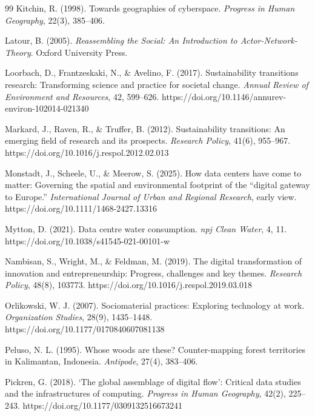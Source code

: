 \documentclass[review]{elsarticle}
\begin{document}
\begin{thebibliography}{99}
Kitchin, R. (1998). Towards geographies of cyberspace. \textit{Progress in Human Geography}, 22(3), 385--406.

Latour, B. (2005). \textit{Reassembling the Social: An Introduction to Actor-Network-Theory}. Oxford University Press.

Loorbach, D., Frantzeskaki, N., \& Avelino, F. (2017). Sustainability transitions research: Transforming science and practice for societal change. \textit{Annual Review of Environment and Resources}, 42, 599--626. https://doi.org/10.1146/annurev-environ-102014-021340

Markard, J., Raven, R., \& Truffer, B. (2012). Sustainability transitions: An emerging field of research and its prospects. \textit{Research Policy}, 41(6), 955--967. https://doi.org/10.1016/j.respol.2012.02.013

Monstadt, J., Scheele, U., \& Meerow, S. (2025). How data centers have come to matter: Governing the spatial and environmental footprint of the ``digital gateway to Europe.'' \textit{International Journal of Urban and Regional Research}, early view. https://doi.org/10.1111/1468-2427.13316

Mytton, D. (2021). Data centre water consumption. \textit{npj Clean Water}, 4, 11. https://doi.org/10.1038/s41545-021-00101-w

Nambisan, S., Wright, M., \& Feldman, M. (2019). The digital transformation of innovation and entrepreneurship: Progress, challenges and key themes. \textit{Research Policy}, 48(8), 103773. https://doi.org/10.1016/j.respol.2019.03.018

Orlikowski, W. J. (2007). Sociomaterial practices: Exploring technology at work. \textit{Organization Studies}, 28(9), 1435--1448. https://doi.org/10.1177/0170840607081138

Peluso, N. L. (1995). Whose woods are these? Counter-mapping forest territories in Kalimantan, Indonesia. \textit{Antipode}, 27(4), 383--406.

Pickren, G. (2018). `The global assemblage of digital flow': Critical data studies and the infrastructures of computing. \textit{Progress in Human Geography}, 42(2), 225--243. https://doi.org/10.1177/0309132516673241


\end{thebibliography}
\end{document}
